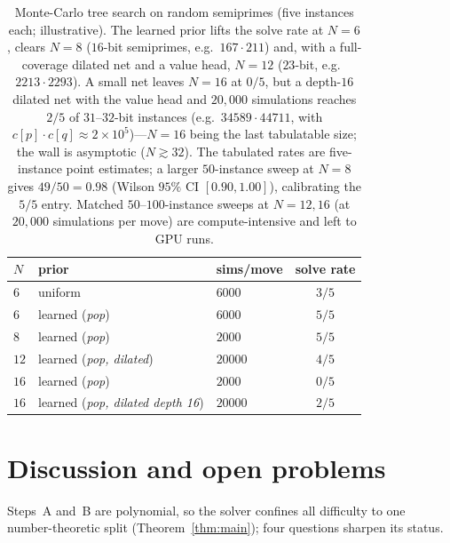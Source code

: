 \documentclass[11pt]{article}
\theoremstyle{definition}
\theoremstyle{plain}
\theoremstyle{remark}
\begin{document}
\begin{table}[t]
\centering
\begin{tabular}{lllc}
\hline
$N$ & prior & sims/move & solve rate\\
\hline
$6$  & uniform                              & $6000$  & $3/5$\\
$6$  & learned (\emph{pop})                 & $6000$  & $5/5$\\
$8$  & learned (\emph{pop})                 & $2000$  & $5/5$\\
$12$ & learned (\emph{pop, dilated})        & $20000$ & $4/5$\\
$16$ & learned (\emph{pop})                 & $2000$  & $0/5$\\
$16$ & learned (\emph{pop, dilated depth 16}) & $20000$ & $2/5$\\
\hline
\end{tabular}
\caption{Monte-Carlo tree search on random semiprimes (five instances each; illustrative).
The learned prior lifts the solve rate at $N=6$, clears $N=8$ ($16$-bit semiprimes, e.g.\
$167\cdot211$) and, with a full-coverage dilated net and a value head, $N=12$ ($23$-bit,
e.g.\ $2213\cdot2293$). A small net leaves $N=16$ at $0/5$, but a depth-$16$ dilated net with
the value head and $20{,}000$ simulations reaches $2/5$ of $31$--$32$-bit instances (e.g.\
$34589\cdot44711$, with $c[p]\cdot c[q]\approx2\times10^{5}$)---$N=16$ being the last
tabulatable size; the wall is asymptotic ($N\gtrsim32$). The tabulated rates are
five-instance point estimates; a larger $50$-instance sweep at $N=8$ gives $49/50=0.98$
(Wilson $95\%$ CI $[0.90,1.00]$), calibrating the $5/5$ entry. Matched $50$--$100$-instance
sweeps at $N=12,16$ (at $20{,}000$ simulations per move) are compute-intensive and left to
GPU runs.}
\label{tab:mcts}
\end{table}

\section{Discussion and open problems}\label{sec:open}

Steps~A and~B are polynomial, so the solver confines all difficulty to one
number-theoretic split (Theorem~\ref{thm:main}); four questions sharpen its status.
\end{document}
